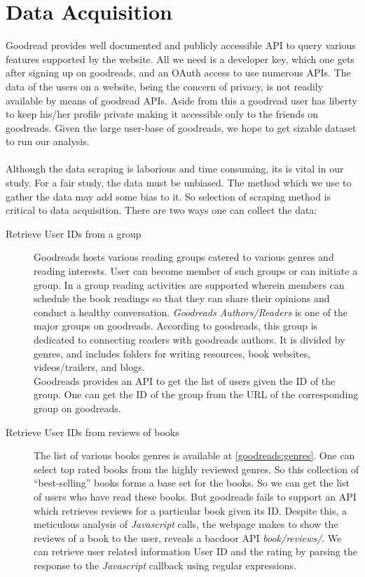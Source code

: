 \documentclass[11pt]{article}
\begin{document}
\section{Data Acquisition}
\label{sec:data_acquisition}
Goodread provides well documented and publicly accessible API to query various features supported by the website. All we need is a developer key, which one gets after signing up on goodreads, and an OAuth access to use numerous APIs. The data of the users on a website, being the concern of privacy, is not readily available by means of goodread APIs. Aside from this a goodread user has liberty to keep his/her profile private making it accessible only to the friends on goodreads. Given the large user-base of goodreads, we hope to get sizable dataset to run our analysis.\\\\
Although the data scraping is laborious and time consuming, its is vital in our study. For a fair study, the data must be unbiased. The method which we use to gather the data may add some bias to it. So selection of scraping method is critical to data acquisition. There are two ways one can collect the data:
\begin{description}
\item[Retrieve User IDs from a group]
Goodreads hosts various reading groups catered to various genres and reading interests. User can become member of such groups or can initiate a group. In a group reading activities are supported wherein members can schedule the book readings so that they can share their opinions and conduct a healthy conversation. {\it Goodreads Authors/Readers} is one of the major groups on goodreads.  According to goodreads, this group is dedicated to connecting readers with goodreads authors. It is divided by genres, and includes folders for writing resources, book websites, videos/trailers, and blogs. \\
Goodreads provides an API to get the list of users given the ID of the group. One can get the ID of the group from the URL of the corresponding group on goodreads.
\item[Retrieve User IDs from reviews of books]
The list of various books genres is available at \ref{goodreads:genres}. One can select top rated books from the highly reviewed genres. So this collection of ``best-selling'' books forms a base set for the books. So we can get the list of users who have read these books. But goodreads fails to support an API which retrieves reviews for a particular book given its ID. Despite this, a meticulous analysis of \textit{Javascript} calls, the webpage makes to show the reviews of a book to the user, reveals a bacdoor API \textit{book/reviews/}. We can retrieve user related information User ID and the rating by parsing the response to the \textit{Javascript} callback using regular expressions.
\end{description}
\end{document}
